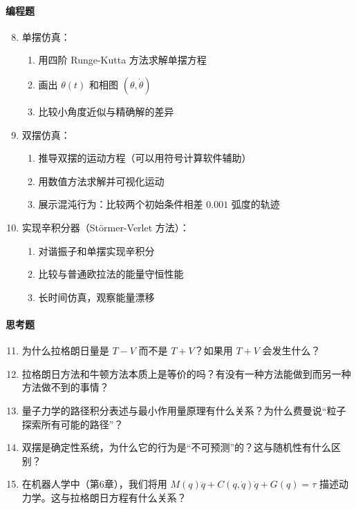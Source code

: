 \paragraph{编程题}
\begin{enumerate}
    \setcounter{enumi}{7}
    \item 单摆仿真：
    \begin{enumerate}
        \item 用四阶 Runge-Kutta 方法求解单摆方程
        \item 画出 $\theta(t)$ 和相图 $(\theta, \dot{\theta})$
        \item 比较小角度近似与精确解的差异
    \end{enumerate}
    
    \item 双摆仿真：
    \begin{enumerate}
        \item 推导双摆的运动方程（可以用符号计算软件辅助）
        \item 用数值方法求解并可视化运动
        \item 展示混沌行为：比较两个初始条件相差 $0.001$ 弧度的轨迹
    \end{enumerate}
    
    \item 实现辛积分器（Störmer-Verlet 方法）：
    \begin{enumerate}
        \item 对谐振子和单摆实现辛积分
        \item 比较与普通欧拉法的能量守恒性能
        \item 长时间仿真，观察能量漂移
    \end{enumerate}
\end{enumerate}

\paragraph{思考题}
\begin{enumerate}
    \setcounter{enumi}{10}
    \item 为什么拉格朗日量是 $T - V$ 而不是 $T + V$？如果用 $T + V$ 会发生什么？
    
    \item 拉格朗日方法和牛顿方法本质上是等价的吗？有没有一种方法能做到而另一种方法做不到的事情？
    
    \item 量子力学的路径积分表述与最小作用量原理有什么关系？为什么费曼说“粒子探索所有可能的路径”？
    
    \item 双摆是确定性系统，为什么它的行为是“不可预测”的？这与随机性有什么区别？
    
    \item 在机器人学中（第6章），我们将用 $M(q)\ddot{q} + C(q,\dot{q})\dot{q} + G(q) = \tau$ 描述动力学。这与拉格朗日方程有什么关系？
\end{enumerate}

